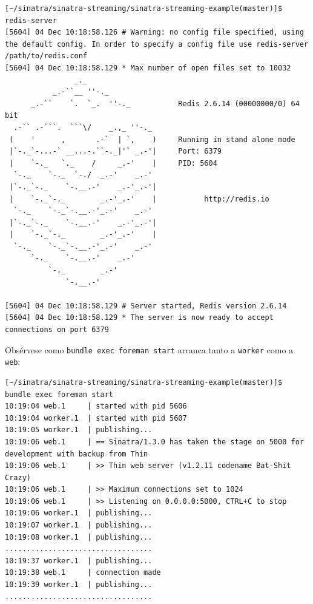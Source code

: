 
\begin{verbatim}
[~/sinatra/sinatra-streaming/sinatra-streaming-example(master)]$ redis-server 
[5604] 04 Dec 10:18:58.126 # Warning: no config file specified, using the default config. In order to specify a config file use redis-server /path/to/redis.conf
[5604] 04 Dec 10:18:58.129 * Max number of open files set to 10032
                _._                                                  
           _.-``__ ''-._                                             
      _.-``    `.  `_.  ''-._           Redis 2.6.14 (00000000/0) 64 bit
  .-`` .-```.  ```\/    _.,_ ''-._                                   
 (    '      ,       .-`  | `,    )     Running in stand alone mode
 |`-._`-...-` __...-.``-._|'` _.-'|     Port: 6379
 |    `-._   `._    /     _.-'    |     PID: 5604
  `-._    `-._  `-./  _.-'    _.-'                                   
 |`-._`-._    `-.__.-'    _.-'_.-'|                                  
 |    `-._`-._        _.-'_.-'    |           http://redis.io        
  `-._    `-._`-.__.-'_.-'    _.-'                                   
 |`-._`-._    `-.__.-'    _.-'_.-'|                                  
 |    `-._`-._        _.-'_.-'    |                                  
  `-._    `-._`-.__.-'_.-'    _.-'                                   
      `-._    `-.__.-'    _.-'                                       
          `-._        _.-'                                           
              `-.__.-'                                               

[5604] 04 Dec 10:18:58.129 # Server started, Redis version 2.6.14
[5604] 04 Dec 10:18:58.129 * The server is now ready to accept connections on port 6379
\end{verbatim}

Obsérvese como \verb|bundle exec foreman start| arranca tanto a \verb|worker| como 
a \verb|web|:

\begin{verbatim}
[~/sinatra/sinatra-streaming/sinatra-streaming-example(master)]$ bundle exec foreman start
10:19:04 web.1     | started with pid 5606
10:19:04 worker.1  | started with pid 5607
10:19:05 worker.1  | publishing...
10:19:06 web.1     | == Sinatra/1.3.0 has taken the stage on 5000 for development with backup from Thin
10:19:06 web.1     | >> Thin web server (v1.2.11 codename Bat-Shit Crazy)
10:19:06 web.1     | >> Maximum connections set to 1024
10:19:06 web.1     | >> Listening on 0.0.0.0:5000, CTRL+C to stop
10:19:06 worker.1  | publishing...
10:19:07 worker.1  | publishing...
10:19:08 worker.1  | publishing...
..................................
10:19:37 worker.1  | publishing...
10:19:38 web.1     | connection made
10:19:39 worker.1  | publishing...
..................................
\end{verbatim}

